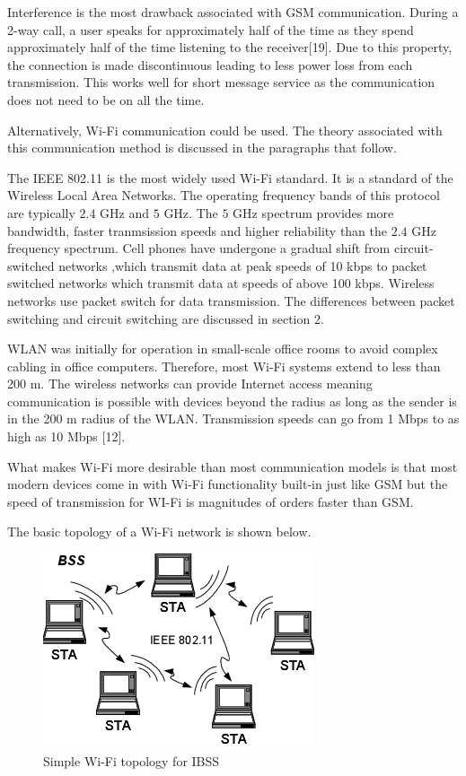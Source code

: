 Interference is the most drawback associated with GSM communication. During a 2-way call, a user speaks for approximately half of the time as they spend approximately half of the time listening to the receiver[19]. Due to this property, the connection is made discontinuous leading to less power loss from each transmission. This works well for short message service as the communication does not need to be on all the time. 
 
Alternatively, Wi-Fi communication could be used. The theory associated with this communication method is discussed in the paragraphs that follow.
 
 
The IEEE 802.11 is the most widely used Wi-Fi standard. It is a standard of the Wireless Local Area Networks. The operating frequency bands of this protocol are typically $2.4$ GHz and $5$ GHz. The $5$ GHz spectrum provides more bandwidth, faster tranmsission speeds and higher reliability than the $2.4$ GHz frequency spectrum. Cell phones have undergone a gradual shift from circuit-switched networks ,which transmit data at peak speeds of 10 kbps to packet switched networks which transmit data at speeds of above 100 kbps. Wireless networks use packet switch for data transmission. The differences between packet switching and circuit switching are discussed in section 2.

WLAN was initially for operation in small-scale office rooms to avoid complex cabling in office computers. Therefore, most Wi-Fi systems extend to less than 200 m. The wireless networks can provide Internet access meaning communication is possible with devices beyond the radius as long as the sender is in the 200 m radius of the WLAN. Transmission speeds can go from 1 Mbps to as high as 10 Mbps [12]. 

What makes Wi-Fi more desirable than most communication models is that most modern devices come in with Wi-Fi functionality built-in just like GSM but the speed of transmission for WI-Fi is magnitudes of orders faster than GSM.

The basic topology of a Wi-Fi network is shown below.
\begin{figure}[h]
	\centering
	\includegraphics[scale=1]{25}
	\caption{Simple Wi-Fi topology for IBSS}
\end{figure}

